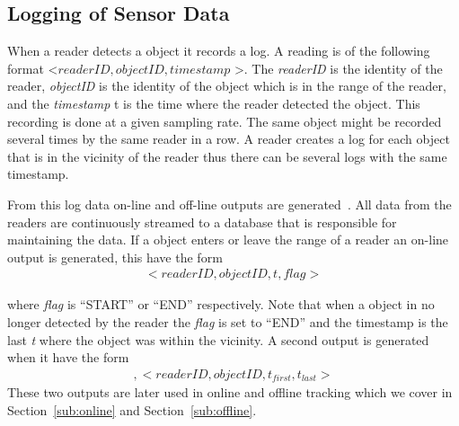 \subsection{Logging of Sensor Data}
When a reader detects a object it records a log. 
A reading is of the following format \textless $readerID,objectID,timestamp$ \textgreater.
The \textit{readerID} is the identity of the reader, \textit{objectID} is the identity of the object which is in the range of the reader, and the \textit{timestamp} t is the time where the reader detected the object.
This recording is done at a given sampling rate. 
The same object might be recorded several times by the same reader in a row. 
A reader creates a log for each object that is in the vicinity of the reader thus there can be several logs with the same timestamp.

From this log data on-line and off-line outputs are generated~\cite{Jensen:2009:GMB:1590953.1591000}.
All data from the readers are continuously streamed to a database that is responsible for maintaining the data.
If a object enters or leave the range of a reader an on-line output is generated, this have the form
\begin{align}
\label{log:online}
<readerID,objectID,t,flag >
\end{align}

where \textit{flag} is "`START"' or "`END"' respectively. 
Note that when a object in no longer detected by the reader  the \textit{flag} is set to "`END"' and the timestamp is the last \textit{t} where the object was within the vicinity.
A second output is generated when it have the form 
\begin{align},
\label{log:offline}
<\textit{$readerID,objectID,t_{first},t_{last}$}>
\end{align}
These two outputs are later used in online and offline tracking which we cover in Section~\ref{sub:online} and Section~\ref{sub:offline}.

 
